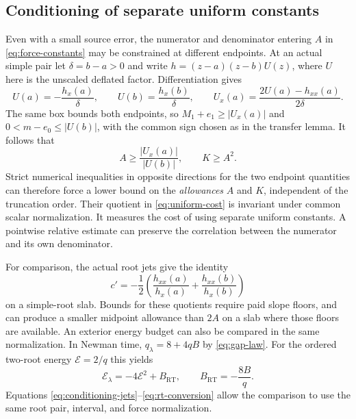 \subsection{Conditioning of separate uniform constants}

Even with a small source error, the numerator and denominator
entering \(A\) in \eqref{eq:force-constants} may be constrained at
different endpoints. At an actual simple pair let \(\delta=b-a>0\)
and write \(h=(z-a)(z-b)U(z)\), where \(U\) here is the unscaled
deflated factor. Differentiation gives
\begin{equation}
 U(a)=-\frac{h_x(a)}{\delta},\qquad
 U(b)=\frac{h_x(b)}{\delta},\qquad
 U_x(a)=\frac{2U(a)-h_{xx}(a)}{2\delta}.
 \label{eq:conditioning-jets}
\end{equation}
The same box bounds both endpoints, so \(M_1+e_1\ge\lvert U_x(a)\rvert\)
and \(0<m-e_0\le\lvert U(b)\rvert\), with the common sign chosen
as in the transfer lemma. It follows that
\begin{equation}
 A\ge \frac{\lvert U_x(a)\rvert}{\lvert U(b)\rvert},
 \qquad K\ge A^2.
 \label{eq:uniform-cost}
\end{equation}
Strict numerical inequalities in opposite directions for the two
endpoint quantities can therefore force a lower bound on the
\emph{allowances} \(A\) and \(K\), independent of the truncation
order. Their quotient in \eqref{eq:uniform-cost} is invariant under
common scalar normalization. It measures the cost of using separate
uniform constants. A pointwise relative estimate can preserve the
correlation between the numerator and its own denominator.

For comparison, the actual root jets give the identity
\[
 c'=-\frac12\left(\frac{h_{xx}(a)}{h_x(a)}
                 +\frac{h_{xx}(b)}{h_x(b)}\right)
\]
on a simple-root slab. Bounds for these quotients require paid slope
floors, and can produce a smaller midpoint allowance than \(2A\) on
a slab where those floors are available. An exterior energy budget can
also be compared in the same normalization. In Newman time,
\(q_\lambda=8+4qB\) by \eqref{eq:gap-law}. For the ordered two-root
energy \(\mathcal E=2/q\) this yields
\begin{equation}
 \mathcal E_\lambda=-4\mathcal E^2+B_{\mathrm{RT}},
 \qquad B_{\mathrm{RT}}=-\frac{8B}{q}.
 \label{eq:rt-conversion}
\end{equation}
Equations \eqref{eq:conditioning-jets}--\eqref{eq:rt-conversion}
allow the comparison to use the same root pair, interval, and force
normalization.

